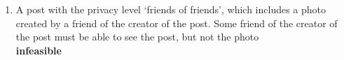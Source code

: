 \documentclass[pdftex,12pt,a4paper]{scrartcl}
\begin{document}
\begin{enumerate}
\begin{center}
  \end{center}
  \item A post with the privacy level `friends of friends', which includes a photo created by a friend of the creator of the post. Some friend of the creator of the post must be able to see the post, but not the photo\\
  {\bf infeasible}

\end{enumerate}
\end{document}
